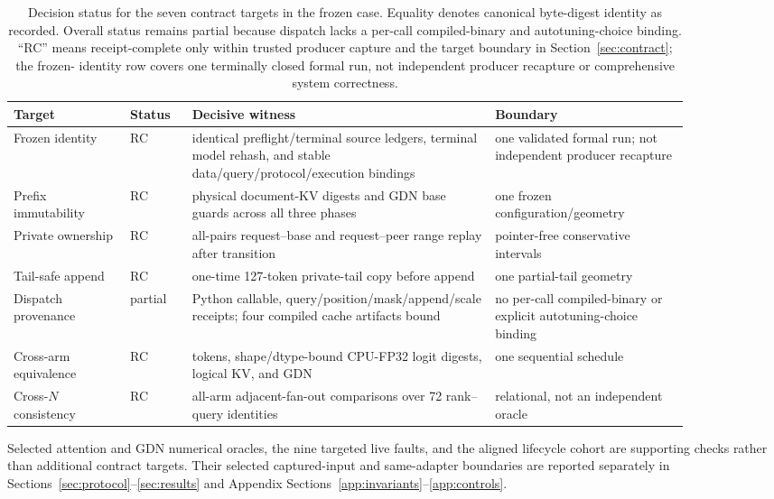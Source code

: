 \documentclass{article}
\begin{document}
\begin{table}[H]
  \caption{Decision status for the seven contract targets in the frozen case.
  Equality denotes canonical byte-digest identity as recorded.  Overall
  status remains partial because dispatch lacks a per-call compiled-binary and
  autotuning-choice binding.  ``RC'' means receipt-complete only within trusted
  producer capture and the target boundary in Section~\ref{sec:contract}; the frozen-
  identity row covers one terminally closed formal run, not independent
  producer recapture or comprehensive system correctness.}
  \label{tab:witness}
  \centering
  \footnotesize
  \begin{tabular}{@{}>{\raggedright\arraybackslash}p{0.15\linewidth}p{0.08\linewidth}>{\raggedright\arraybackslash}p{0.39\linewidth}>{\raggedright\arraybackslash}p{0.25\linewidth}@{}}
    \toprule
    Target & Status & Decisive witness & Boundary \\
    \midrule
    Frozen identity & RC & identical preflight/terminal source ledgers, terminal model rehash, and stable data/query/protocol/execution bindings & one validated formal run; not independent producer recapture \\
    Prefix immutability & RC & physical document-KV digests and GDN base guards across all three phases & one frozen configuration/geometry \\
    Private ownership & RC & all-pairs request--base and request--peer range replay after transition & pointer-free conservative intervals \\
    Tail-safe append & RC & one-time 127-token private-tail copy before append & one partial-tail geometry \\
    Dispatch provenance & partial & Python callable, query/position/mask/append/scale receipts; four compiled cache artifacts bound & no per-call compiled-binary or explicit autotuning-choice binding \\
    Cross-arm equivalence & RC & tokens, shape/dtype-bound CPU-FP32 logit digests, logical KV, and GDN & one sequential schedule \\
    Cross-$N$ consistency & RC & 288 all-arm adjacent-fan-out comparisons over 72 rank--query identities & relational, not an independent oracle \\
    \bottomrule
  \end{tabular}
\end{table}

Selected attention and GDN numerical oracles, the nine targeted live faults,
and the aligned lifecycle cohort are supporting checks rather than additional
contract targets.  Their selected captured-input and same-adapter boundaries are
reported separately in Sections~\ref{sec:protocol}--\ref{sec:results} and Appendix
Sections~\ref{app:invariants}--\ref{app:controls}.
\end{document}
